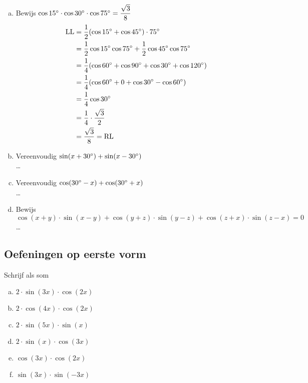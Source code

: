 \documentclass[a4paper,12pt]{article}
\begin{document}
\begin{theorie}
\begin{enumerate}[(a)]
  \item Bewijs $\cos 15^\circ \cdot \cos 30^\circ \cdot \cos 75^\circ = \dfrac{\sqrt{3}}{8}$
  \begin{align*}
    \mbox{LL} &= \dfrac{1}{2}(\cos 15^\circ + \cos 45^\circ)\cdot 75^\circ\\
              &= \dfrac{1}{2}\cos 15^\circ \cos 75^\circ + \dfrac{1}{2}\cos 45^\circ \cos 75^\circ\\
              &= \dfrac{1}{4}(\cos 60^\circ + \cos 90^\circ + \cos 30^\circ + \cos 120^\circ)\\
              &= \dfrac{1}{4}(\cos 60^\circ + 0 + \cos 30^\circ - \cos 60^\circ)\\
              &= \dfrac{1}{4}\cos 30^\circ\\
              &= \dfrac{1}{4}\cdot\dfrac{\sqrt{3}}{2}\\
              &= \dfrac{\sqrt{3}}{8} = \mbox{RL}
  \end{align*}
  \item Vereenvoudig $\sin(x+30^\circ)+\sin(x-30^\circ)$\\
  \ldots
  \item Vereenvoudig $\cos(30^\circ-x)+\cos(30^\circ+x)$\\
  \ldots
  \item Bewijs $\cos(x+y)\cdot\sin(x-y)+\cos(y+z)\cdot\sin(y-z)+\cos(z+x)\cdot\sin(z-x)=0$\\
  \ldots
\end{enumerate}

\pagebreak
\subsection{Oefeningen op eerste vorm}

\end{theorie}

\begin{oefening}
Schrijf als som
\begin{enumerate}[(a)]
\itemsep.5em
  \item $2\cdot \sin(3x)\cdot \cos(2x)$
  \item $2\cdot \cos(4x)\cdot \cos(2x)$
  \item $2\cdot \sin(5x)\cdot \sin(x)$
  \item $2\cdot \sin(x)\cdot \cos(3x)$
  \item $\cos(3x)\cdot \cos(2x)$
  \item $\sin(3x)\cdot \sin(-3x)$
\end{enumerate}
\end{oefening}
\end{document}

